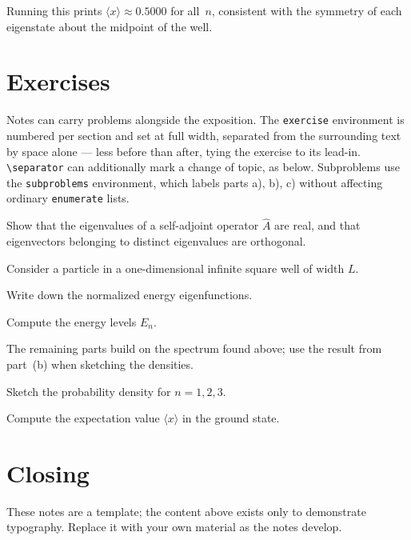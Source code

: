 \documentclass[a4paper,11pt]{article}
\begin{document}
Running this prints $\langle x \rangle \approx 0.5000$ for all~$n$,
consistent with the symmetry of each eigenstate about the midpoint
of the well.


\section{Exercises}

Notes can carry problems alongside the exposition. The
\verb|exercise| environment is numbered per section and set
at full width, separated from the surrounding text by space
alone — less before than after, tying the exercise to its
lead-in. \verb|\separator| can additionally mark a change of
topic, as below. Subproblems use the \verb|subproblems|
environment, which labels parts a), b), c) without affecting
ordinary \verb|enumerate| lists.

\separator

\begin{exercise}
  Show that the eigenvalues of a self-adjoint operator
  $\hat{A}$ are real, and that eigenvectors belonging to
  distinct eigenvalues are orthogonal.
\end{exercise}

\begin{exercise}
  Consider a particle in a one-dimensional infinite square
  well of width $L$.
  \begin{subproblems}
    \item Write down the normalized energy eigenfunctions.
    \item Compute the energy levels $E_n$.
  \end{subproblems}

  The remaining parts build on the spectrum found above; use
  the result from part~(b) when sketching the densities.

  \begin{subproblems}[resume]
    \item Sketch the probability density for $n = 1, 2, 3$.
    \item Compute the expectation value $\langle x \rangle$ in
          the ground state.
  \end{subproblems}
\end{exercise}


\section{Closing}

These notes are a template; the content above exists only to
demonstrate typography. Replace it with your own material as the
notes develop.




\end{document}

